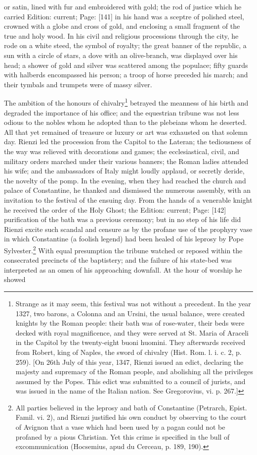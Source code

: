 or satin, lined with fur and embroidered with gold; the rod of justice which he carried Edition: current; Page: [141] in his hand was a sceptre of polished steel, crowned with a globe and cross of gold, and enclosing a small fragment of the true and holy wood. In his civil and religious processions through the city, he rode on a white steed, the symbol of royalty; the great banner of the republic, a sun with a circle of stars, a dove with an olive-branch, was displayed over his head; a shower of gold and silver was scattered among the populace; fifty guards with halberds encompassed his person; a troop of horse preceded his march; and their tymbals and trumpets were of massy silver.

The ambition of the honours of chivalry\footnote{Strange as it may seem, this festival was not without a precedent. In the year 1327, two barons, a Colonna and an Ursini, the usual balance, were created knights by the Roman people: their bath was of rose-water, their beds were decked with royal magnificence, and they were served at St. Maria of Araceli in the Capitol by the twenty-eight buoni huomini. They afterwards received from Robert, king of Naples, the sword of chivalry (Hist. Rom. l. i. c. 2, p. 259). [On 26th July of this year, 1347, Rienzi issued an edict, declaring the majesty and supremacy of the Roman people, and abolishing all the privileges assumed by the Popes. This edict was submitted to a council of jurists, and was issued in the name of the Italian nation. See Gregorovius, vi. p. 267.]} betrayed the meanness of his birth and degraded the importance of his office; and the equestrian tribune was not less odious to the nobles whom he adopted than to the plebeians whom he deserted. All that yet remained of treasure or luxury or art was exhausted on that solemn day. Rienzi led the procession from the Capitol to the Lateran; the tediousness of the way was relieved with decorations and games; the ecclesiastical, civil, and military orders marched under their various banners; the Roman ladies attended his wife; and the ambassadors of Italy might loudly applaud, or secretly deride, the novelty of the pomp. In the evening, when they had reached the church and palace of Constantine, he thanked and dismissed the numerous assembly, with an invitation to the festival of the ensuing day. From the hands of a venerable knight he received the order of the Holy Ghost; the Edition: current; Page: [142] purification of the bath was a previous ceremony; but in no step of his life did Rienzi excite such scandal and censure as by the profane use of the prophyry vase in which Constantine (a foolish legend) had been healed of his leprosy by Pope Sylvester.\footnote{All parties believed in the leprosy and bath of Constantine (Petrarch, Epist. Famil. vi. 2), and Rienzi justified his own conduct by observing to the court of Avignon that a vase which had been used by a pagan could not be profaned by a pious Christian. Yet this crime is specified in the bull of excommunication (Hocsemius, apud du Cerceau, p. 189, 190).} With equal presumption the tribune watched or reposed within the consecrated precincts of the baptistery; and the failure of his state-bed was interpreted as an omen of his approaching downfall. At the hour of worship he showed 